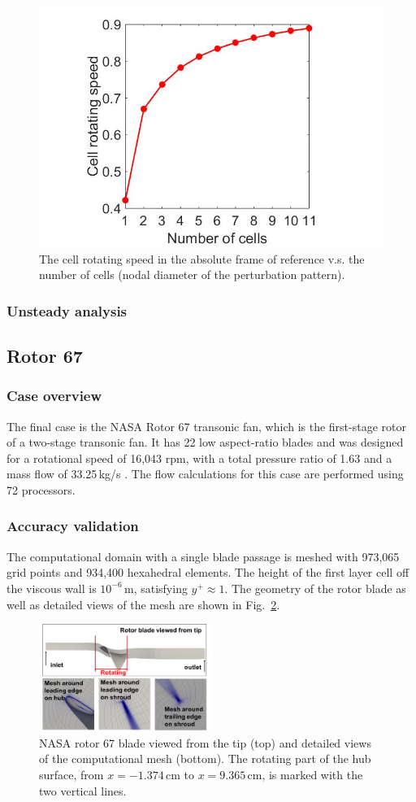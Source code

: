 \documentclass[journal,final]{new-aiaa}
\begin{document}
\begin{figure}[htb]
	\centering   
{\tiny }	\includegraphics[width=.4\textwidth]{pic/speed-vs-nd.jpg}
	\caption{The cell rotating speed in the absolute frame of reference v.s. the number of cells (nodal diameter of the perturbation pattern).}
	\label{fig:r67-eigenvector-18kpa}
\end{figure}

\subsubsection{Unsteady analysis}

\subsection {Rotor 67}
		\subsubsection{Case overview}
The final case is the NASA Rotor 67 transonic fan, which
is the first-stage rotor of a two-stage transonic fan.
It has 22 low aspect-ratio blades and was designed for
a rotational speed of 16,043 rpm, with a total pressure ratio
of 1.63 and a mass flow of 33.25\,kg/s \cite{Strazisar1989Laser}.
The flow calculations for this case are performed
using 72 processors.

\subsubsection{Accuracy validation}
The computational domain with a single blade passage is meshed
with 973,065 grid points and 934,400 hexahedral elements. The
height of the first layer cell off the viscous wall is $10^{-6}$\,m,
satisfying $y^+\!\approx\!1$. The geometry of the rotor blade as well as
detailed views of the mesh are shown in Fig.~\ref{rotor67-view}.

\begin{figure}[htb]
	\centering   
	\includegraphics[width=0.5\textwidth]{rotor67/rotor67-geo-mesh.png}
	\caption{NASA rotor 67 blade viewed from the tip (top)
		and detailed views of the computational mesh (bottom). %
		The rotating part of the hub surface, from
		$x=-1.374$\,cm to $x=9.365$\,cm, is marked with the two vertical lines.}	
	\label{rotor67-view} 
\end{figure}
\end{document}
